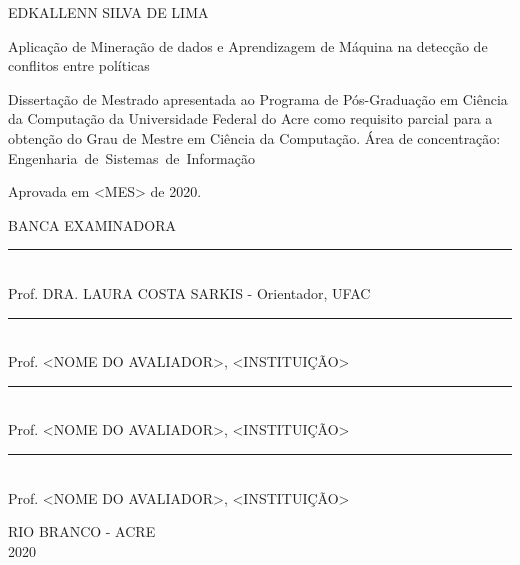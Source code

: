 \vspace{-60mm}

\begin{center}
   {\large EDKALLENN SILVA DE LIMA}\\
   \vspace{7mm}

  Aplicação de Mineração de dados e Aprendizagem de Máquina na detecção de conflitos entre políticas\\
  \vspace{10mm}
\end{center}

\noindent
\begin{flushright}
\begin{minipage}[t]{8cm}

Dissertação de Mestrado apresentada ao Programa de Pós-Gradua\c{c}\~{a}o em Ciência da Computação da Universidade Federal do Acre como requisito parcial para a obtenção do Grau de Mestre em Ciência da Computação. \'{A}rea de concentra\c{c}\~{a}o: \mbox{Engenharia de Sistemas de Informação} 

\end{minipage}
\end{flushright}
\vspace{1.0 cm}
\noindent
{Aprovada em <MES> de 2020.} \\
\begin{flushright}
  \parbox{11cm}
  {
  \begin{center}
  BANCA EXAMINADORA \\
  \vspace{6mm}
  \rule{11cm}{.1mm} \\
    Prof. DRA. LAURA COSTA SARKIS - Orientador, UFAC \\
    \vspace{6mm}
  \rule{11cm}{.1mm} \\
    Prof. <NOME DO AVALIADOR>, <INSTITUI\c{C}\~AO>\\
    \vspace{6mm}
  \rule{11cm}{.1mm} \\
    Prof. <NOME DO AVALIADOR>, <INSTITUI\c{C}\~AO>\\
  \vspace{4mm}
  \rule{11cm}{.1mm} \\
    Prof. <NOME DO AVALIADOR>, <INSTITUI\c{C}\~AO>\\
    \vspace{6mm}

  \end{center}
  }
\end{flushright}
\begin{center}
  \vspace{4mm}
  RIO BRANCO - ACRE \\
  2020

\end{center}

